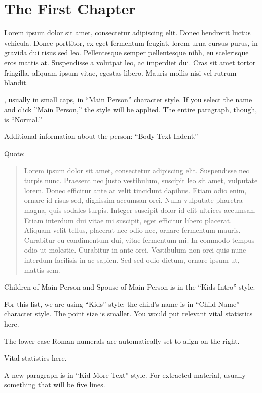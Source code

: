 \chapter{The First Chapter}

 Lorem ipsum dolor sit amet, consectetur adipiscing elit. Donec hendrerit luctus vehicula. Donec porttitor, ex eget fermentum feugiat, lorem urna\cite{lamport94} cursus purus, in gravida dui risus sed leo. Pellentesque semper pellentesque nibh, eu scelerisque eros mattis at. Suspendisse a volutpat leo, ac imperdiet dui. Cras sit amet tortor fringilla, aliquam ipsum vitae, egestas libero. Mauris mollis nisi vel rutrum blandit. 

, usually in small caps, in ``Main Person'' character style. If you select the name and click ''Main Person,'' the style will be applied. The entire paragraph, though, is ``Normal.''
	
Additional information about the person: ``Body Text Indent.''

Quote:

\begin{quote}
	Lorem ipsum dolor sit amet, consectetur adipiscing elit. Suspendisse nec turpis nunc. Praesent nec justo vestibulum, suscipit leo sit amet, vulputate lorem. Donec efficitur ante at velit tincidunt dapibus. Etiam odio enim, ornare id risus sed, dignissim accumsan orci. Nulla vulputate pharetra magna, quis sodales turpis. Integer suscipit dolor id elit ultrices accumsan. Etiam interdum dui vitae mi suscipit, eget efficitur libero placerat. Aliquam velit tellus, placerat nec odio nec, ornare fermentum mauris. Curabitur eu condimentum dui, vitae fermentum mi. In commodo tempus odio ut molestie. Curabitur in ante orci. Vestibulum non orci quis nunc interdum facilisis in ac sapien. Sed sed odio dictum, ornare ipsum ut, mattis sem. 
\end{quote}

\begin{KidsIntro}
	Children of Main Person and Spouse of Main Person is in the ``Kids Intro'' style.
\end{KidsIntro}

\begin{Kids}

	 For this list, we are using ``Kids'' style; the child's name is in ``Child Name'' character style. The point size is smaller. You would put relevant vital statistics here.
	
	 The lower-case Roman numerals are automatically set to align on the right.
	
	 Vital statistics here.
	
	\begin{KidsMoreText}A new paragraph is in ``Kid More Text'' style. For extracted material, usually something that will be five lines.\end{KidsMoreText}

\end{Kids}

